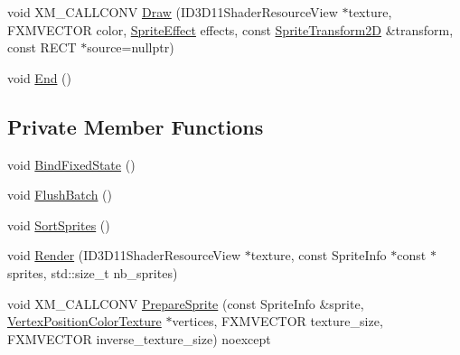 \begin{DoxyCompactItemize}
\item 
void X\+M\+\_\+\+C\+A\+L\+L\+C\+O\+NV \mbox{\hyperlink{classmage_1_1rendering_1_1_sprite_batch_1_1_impl_af679adcb342d448dfd35a5462f1c43fd}{Draw}} (I\+D3\+D11\+Shader\+Resource\+View $\ast$texture, F\+X\+M\+V\+E\+C\+T\+OR color, \mbox{\hyperlink{namespacemage_1_1rendering_a4dbc3536c87b906f1d41d863ec458e78}{Sprite\+Effect}} effects, const \mbox{\hyperlink{classmage_1_1_sprite_transform2_d}{Sprite\+Transform2D}} \&transform, const R\+E\+CT $\ast$source=nullptr)
\item 
void \mbox{\hyperlink{classmage_1_1rendering_1_1_sprite_batch_1_1_impl_a46d4871b99ac78e00f703ca4297e67f3}{End}} ()
\end{DoxyCompactItemize}
\subsection*{Private Member Functions}
\begin{DoxyCompactItemize}
\item 
void \mbox{\hyperlink{classmage_1_1rendering_1_1_sprite_batch_1_1_impl_ab07518664c50c9ddd08eb484bc0df0e0}{Bind\+Fixed\+State}} ()
\item 
void \mbox{\hyperlink{classmage_1_1rendering_1_1_sprite_batch_1_1_impl_a65afd35385400d629abc9f60adfadeff}{Flush\+Batch}} ()
\item 
void \mbox{\hyperlink{classmage_1_1rendering_1_1_sprite_batch_1_1_impl_a2573f39b9f7f87b2acd7eadc348c1e2b}{Sort\+Sprites}} ()
\item 
void \mbox{\hyperlink{classmage_1_1rendering_1_1_sprite_batch_1_1_impl_a9371c90f00b4bd2b606ee2b5c8ee5e5e}{Render}} (I\+D3\+D11\+Shader\+Resource\+View $\ast$texture, const Sprite\+Info $\ast$const $\ast$sprites, std\+::size\+\_\+t nb\+\_\+sprites)
\item 
void X\+M\+\_\+\+C\+A\+L\+L\+C\+O\+NV \mbox{\hyperlink{classmage_1_1rendering_1_1_sprite_batch_1_1_impl_adce1a1942833a97fb14a20bc4add8c31}{Prepare\+Sprite}} (const Sprite\+Info \&sprite, \mbox{\hyperlink{structmage_1_1rendering_1_1_vertex_position_color_texture}{Vertex\+Position\+Color\+Texture}} $\ast$vertices, F\+X\+M\+V\+E\+C\+T\+OR texture\+\_\+size, F\+X\+M\+V\+E\+C\+T\+OR inverse\+\_\+texture\+\_\+size) noexcept
\end{DoxyCompactItemize}
